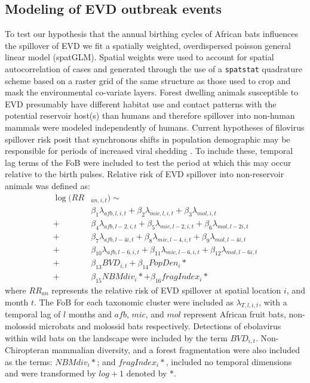 \documentclass[9pt,twoside,lineno]{pnas-new}
\begin{document}
\subsection*{Modeling of EVD outbreak events}
\label{spatGLM}
To test our hypothesis that the annual birthing cycles of African bats influences the spillover of EVD we fit a spatially weighted, overdispersed poisson general linear model (spatGLM). Spatial weights were used to account for spatial autocorrelation of cases and generated through the use of a \texttt{spatstat} quadrature scheme based on a raster grid of the same structure as those used to crop and mask the environmental co-variate layers. Forest dwelling animals susceptible to EVD presumably have different habitat use and contact patterns with the potential reservoir host(s) than humans and therefore spillover into non-human mammals were modeled independently of humans. Current hypotheses of filovirus spillover risk posit that synchronous shifts in population demographic may be responsible for periods of increased viral shedding \cite{Hayman2015BiannualPopulations, Pourrut2009LargeAegyptiacus.}. To include these, temporal lag terms of the FoB were included to test the period at which this may occur relative to the birth pulses. Relative risk of EVD spillover into non-reservoir animals was defined as:
\[
\begin{split}
    \log(RR& _{an, i, t}) \sim \\
    & \beta_1 \lambda_{afb, l, i, t} + \beta_2 \lambda_{mic, l, i, t} + \beta_3 \lambda_{mol, i, t} \\
 + &\beta_4 \lambda_{afb, l-2, i, t} + \beta_5 \lambda_{mic, l-2, i, t} + \beta_6 \lambda_{mol, l-2 i, t} \\
 + &\beta_7 \lambda_{afb, l-4 i, t} + \beta_8 \lambda_{mic, l-4, i, t} + \beta_9 \lambda_{mol, l-4 i, t} \\
 + &\beta_{10} \lambda_{afb, l-6, i, t} + \beta_{11} \lambda_{mic, l-6, i, t} + \beta_{12} \lambda_{mol, l-6 i, t} \\
 +&\beta_{13} BVD_{i,t} + \beta_{14} PopDen_{i}*  \\
 + &\beta_{15} NBM div_{i}* + \beta_{16} fragIndex_{i}* 
\end{split}
\]
where $RR_{an}$ represents the relative risk of EVD spillover at spatial location $i$, and month $t$. The FoB for each taxonomic cluster were included as $\lambda_{T, l, i, t}$, with a temporal lag of $l$ months and $afb$, $mic$, and $mol$ represent African fruit bats, non-molossid microbats and molossid bats respectively. Detections of ebolavirus within wild bats on the landscape were included by the term $BVD_{i,t}$. Non-Chiropteran mammalian diversity, and a forest fragmentation were also included as the terms: $NBM div_{i}*$; and $fragIndex_{i}*$, included no temporal dimensions and were transformed by $log +1$ denoted by $*$.\par
\end{document}
